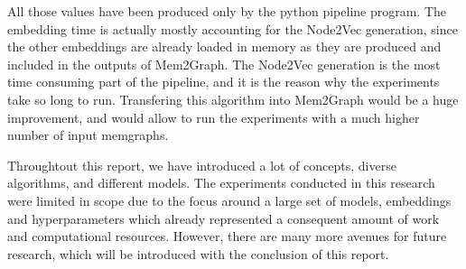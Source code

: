 All those values have been produced only by the python pipeline program. The embedding time is actually mostly accounting for the Node2Vec generation, since the other embeddings are already loaded in memory as they are produced and included in the outputs of Mem2Graph. The Node2Vec generation is the most time consuming part of the pipeline, and it is the reason why the experiments take so long to run. Transfering this algorithm into Mem2Graph would be a huge improvement, and would allow to run the experiments with a much higher number of input memgraphs.

Throughtout this report, we have introduced a lot of concepts, diverse algorithms, and different models. The experiments conducted in this research were limited in scope due to the focus around a large set of models, embeddings and hyperparameters which already represented a consequent amount of work and computational resources. However, there are many more avenues for future research, which will be introduced with the conclusion of this report.
